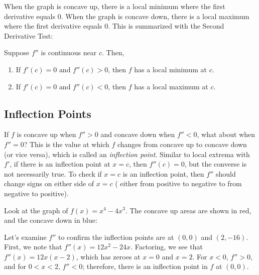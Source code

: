 When the graph is concave up, there is a local minimum where the first 
derivative equals $0$. When the graph is concave down, there is a local 
maximum where the first derivative equals $0$. This is summarized with the 
Second Derivative Test:

Suppose $f''$ is continuous near $c$. Then,
\begin{enumerate}
\item If $f'(c) = 0 \text{ and } f''(c)>0$, then $f$ has a local minimum at $c$.
\item If $f'(c) =0 \text{ and } f''(c)<0$, then $f$ has a local maximum at $c$. 
\end{enumerate}


\subsection{Inflection Points}
If $f$ is concave up when $f''>0$ and concave down when $f''<0$, what about 
when $f''=0$? This is the value at which $f$ changes from concave up to concave 
down (or vice versa), which is called an \textit{inflection point}. Similar to 
local extrema with $f'$, if there is an inflection point at $x=c$, then $f''(c)
=0$, but the converse is not necessarily true. To check if $x=c$ is an 
inflection point, then $f''$ should change signs on either side of $x=c$ (
either from positive to negative to from negative to positive). 

Look at the graph of $f(x) = x^4-4x^3$. The concave up areas are shown in red, 
and the concave down in blue:

\begin{figure}[htbp]
\centering
{}
\end{figure}
Let's examine $f''$ to confirm the inflection points are at $(0, 0)$ and $(2, 
-16)$. First, we note that $f''(x) = 12x^2-24x$. Factoring, we see that $f''(x) 
= 12x(x-2)$, which has zeroes at $x=0$ and $x=2$. For $x<0$, $f''>0$, and for 
$0<x<2$, $f''<0$; therefore, there is an inflection point in $f$ at $(0, 0)$. 

